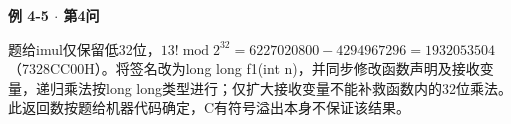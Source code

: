 {\color{ink}\bfseries 例 4-5 \(\cdot \) 第4问}\par\vspace{1bp}题给imul仅保留低32位，\(13! \operatorname{mod} 2^{32}=\allowbreak{}6227020800-4294967296=\allowbreak{}1932053504\)（7328CC00H）。将签名改为long long f1(int n)，并同步修改函数声明及接收变量，递归乘法按long long类型进行；仅扩大接收变量不能补救函数内的32位乘法。此返回数按题给机器代码确定，C有符号溢出本身不保证该结果。
